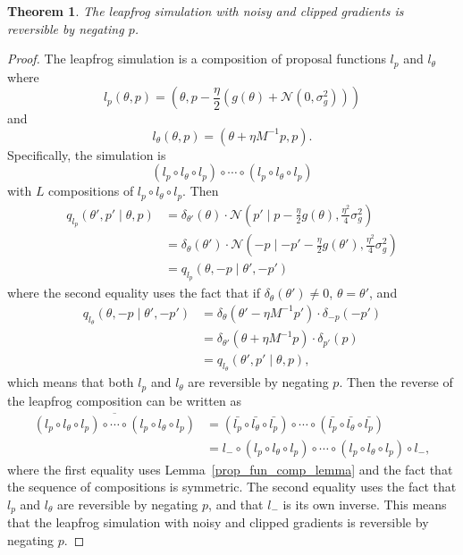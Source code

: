 \documentclass[english,twoside,openright]{HYgraduMLDS}
\newtheorem{theorem}{Theorem}
\newcommand{\caln}{{\mathcal{N}}}
\begin{document}
\begin{theorem}\label{leapfrog_revers_theorem}
  The leapfrog simulation with noisy and clipped gradients is reversible by
  negating \(p\).
\end{theorem}
\begin{proof}
  The leapfrog simulation is a composition of proposal functions
  \(l_{p}\) and \(l_{\theta}\) where
  \[
    l_{p}(\theta, p) = \left(\theta, p - \frac{\eta}{2}(g(\theta)
      + \caln(0, \sigma_{g}^{2}))\right)
  \]
  and
  \[
    l_{\theta}(\theta, p) = (\theta + \eta M^{-1}p, p).
  \]
  Specifically, the simulation is
  \[
    (l_{p} \circ l_{\theta}\circ l_{p})\circ
    \dotsb \circ (l_{p}\circ l_{\theta}\circ l_{p})
  \]
  with \(L\) compositions of \(l_{p} \circ l_{\theta}\circ l_{p}\).
  Then
  \begin{align*}
    q_{l_{p}}(\theta', p'\mid \theta, p) &= \delta_{\theta'}(\theta)
    \cdot \caln\left(p'\mid p - \frac{\eta}{2}g(\theta), \frac{\eta^{2}}{4}\sigma_{g}^{2}\right)
    \\&= \delta_{\theta}(\theta')
    \cdot \caln\left(-p\mid -p' - \frac{\eta}{2}g(\theta'), \frac{\eta^{2}}{4}\sigma_{g}^{2}\right)
    \\&= q_{l_{p}}(\theta, -p\mid \theta', -p')
  \end{align*}
  where the second equality uses the fact that if
  \(\delta_{\theta}(\theta')\neq 0\), \(\theta = \theta'\),
  and
  \begin{align*}
	q_{l_{\theta}}(\theta, -p\mid \theta', -p')
    &= \delta_{\theta}(\theta' - \eta M^{-1}p')\cdot\delta_{-p}(-p')
    \\&= \delta_{\theta'}(\theta + \eta M^{-1}p)\cdot\delta_{p'}(p)
	\\&= q_{l_{\theta}}(\theta', p'\mid \theta, p),
  \end{align*}
  which means that both \(l_{p}\) and \(l_{\theta}\) are reversible by
  negating \(p\). Then the reverse of the leapfrog composition can be
  written as
  \begin{align*}
	\overline{(l_{p} \circ l_{\theta}\circ l_{p})\circ
    \dotsb \circ (l_{p}\circ l_{\theta}\circ l_{p})}
    &= (\bar{l_{p}}\circ \bar{l_{\theta}} \circ \bar{l_{p}}) \circ \dotsb \circ
    (\bar{l_{p}}\circ \bar{l_{\theta}} \circ \bar{l_{p}})
    \\&= l_{-}\circ(l_{p}\circ l_{\theta} \circ l_{p}) \circ \dotsb \circ
    (l_{p}\circ l_{\theta} \circ l_{p})\circ l_{-},
  \end{align*}
  where the first equality uses Lemma~\ref{prop_fun_comp_lemma} and
  the fact that the sequence of compositions is symmetric.
  The second equality uses the fact that \(l_{p}\) and \(l_{\theta}\)
  are reversible by negating \(p\), and that \(l_{-}\) is its own inverse.
  This means that the leapfrog simulation with noisy and clipped gradients is
  reversible by negating \(p\).
\end{proof}
\end{document}
